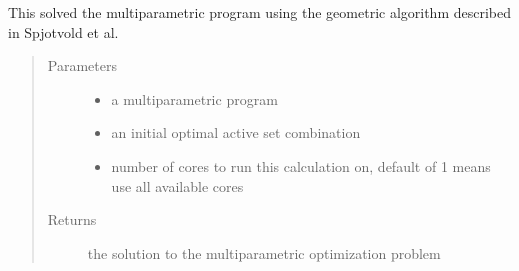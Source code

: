 \documentclass[letterpaper,10pt,english]{sphinxmanual}
\begin{document}

\begin{fulllineitems}
\label{\detokenize{ppopt.mp_solvers:ppopt.mp_solvers.mpqp_parallel_geometric.solve}}
\sphinxAtStartPar
This solved the multiparametric program using the geometric algorithm described in Spjotvold et al.

\sphinxAtStartPar
{}
\begin{quote}\begin{description}
\item[{Parameters}] \leavevmode\begin{itemize}
\item {} 
\sphinxAtStartPar
{} \textendash{} a multiparametric program

\item {} 
\sphinxAtStartPar
{} \textendash{} an initial optimal active set combination

\item {} 
\sphinxAtStartPar
{} \textendash{} number of cores to run this calculation on, default of \sphinxhyphen{}1 means use all available cores

\end{itemize}

\item[{Returns}] \leavevmode
\sphinxAtStartPar
the solution to the multiparametric optimization problem

\end{description}\end{quote}

\end{fulllineitems}
\end{document}
